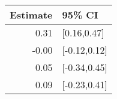 \begin{tabular}{rl}
  \hline
Estimate & 95\% CI \\ 
  \hline
0.31 & [0.16,0.47] \\ 
  -0.00 & [-0.12,0.12] \\ 
  0.05 & [-0.34,0.45] \\ 
  0.09 & [-0.23,0.41] \\ 
   \hline
\end{tabular}

